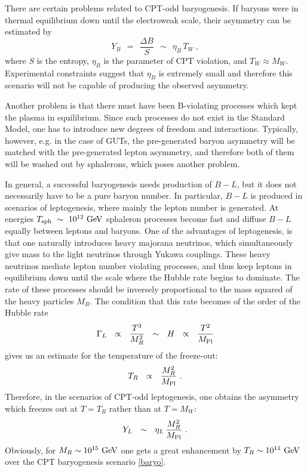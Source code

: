 \documentclass[12pt]{revtex4}
\newcommand{\Mpl}{M_{\rm Pl}}
\newcommand{\Tsph}{T_{\rm sph}}
\newcommand{\GeV}{{\rm GeV}}
\begin{document}
	There are certain problems related to CPT-odd baryogenesis.
	If baryons were in thermal equilibrium down until the electroweak scale,
	their asymmetry can be estimated by 
\begin{equation}
\label{baryo}
	Y_B ~~=~~ \frac{\Delta B}{S} ~~\sim~~  \eta_B \, T_W~,
\end{equation}
	where $ S $ is the entropy, $ \eta_B $ is the parameter of CPT violation, 
	and $ T_W \approx M_W $.
	Experimental constraints suggest that $ \eta_B $ is extremely small and
	therefore this scenario will not be capable of producing the observed asymmetry.

	Another problem is that there must have been B-violating processes which kept
	the plasma in equilibrium.
	Since such processes do not exist in the Standard Model, one has to introduce
	new degrees of freedom and interactions.
	Typically, however, e.g. in the case of GUTs, the pre-generated baryon asymmetry
	will be matched with the pre-generated lepton asymmetry, and therefore both
	of them will be washed out by sphalerons, which poses another problem.

	In general, a successful baryogenesis needs production of $ B - L $, but it does
	not necessarily have to be a pure baryon number.
	In particular, $ B - L $ is produced in scenarios of leptogenesis, where mainly
	the lepton number is generated.
	At energies $ \Tsph ~\sim~ 10^{12}~\GeV $ sphaleron processes become fast and 
	diffuse $ B - L $ equally between leptons and baryons. 
	One of the advantages of leptogenesis, is that one naturally introduces 
	heavy majorana neutrinos, which simultaneously give mass to the light neutrinos
	through Yukawa couplings.
	These heavy neutrinos mediate lepton number violating processes, and thus keep
	leptons in equilibrium down until the scale where the Hubble rate begins to dominate.
	The rate of these processes should be inversely proportional to the mass squared
	of the heavy particles $ M_R $.
	The condition that this rate becomes of the order of the Hubble rate
\[
	\Gamma_L ~~\propto~~ \frac{T^3}{M_R^2} ~~\sim~~ H ~~\propto~~ \frac{T^2}{\Mpl}
\]
	gives us an estimate for the temperature of the freeze-out:
\[
	T_R ~~\propto~~ \frac{M_R^2}{\Mpl}~.
\]
	Therefore, in the scenarios of CPT-odd leptogenesis, one obtains the asymmetry
	which freezes out at $ T = T_R $ rather than at $ T = M_W $:
\[
	Y_L ~~\sim~~ \eta_L\, \frac{M_R^2}{\Mpl}~.
\]
	Obviously, for 	$ M_R \sim 10^{15}~\GeV $ one gets a great enhancement 
	by $ T_R \sim 10^{11}~\GeV $ over the CPT baryogenesis scenario \eqref{baryo}.
\end{document}
